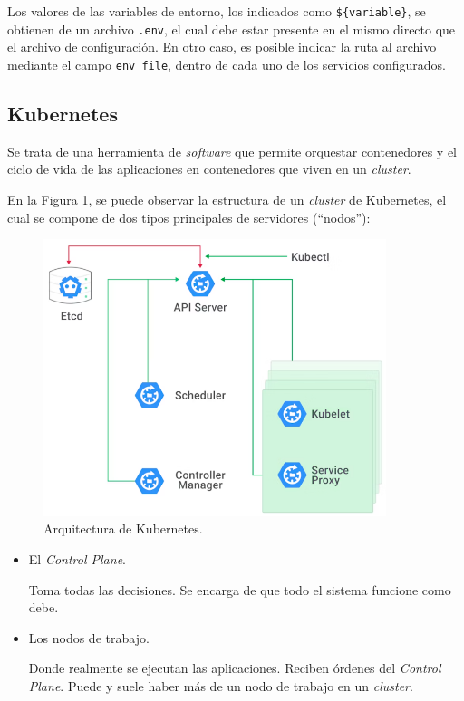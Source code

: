 Los valores de las variables de entorno, los indicados como \texttt{\$\{variable\}}, se obtienen de un archivo \texttt{.env}, el cual debe estar presente en el mismo directo que el archivo de configuración. En otro caso, es posible indicar la ruta al archivo mediante el campo \texttt{env\_file}, dentro de cada uno de los servicios configurados.

\subsection*{Kubernetes}
\label{tech:k8s}

Se trata de una herramienta de \textit{software} que permite orquestar contenedores y el ciclo de vida de las aplicaciones en contenedores que viven en un \textit{cluster}.

En la Figura \ref{fig:k8s}, se puede observar la estructura de un \textit{cluster} de Kubernetes, el cual se compone de dos tipos principales de servidores (``nodos''):

\begin{figure}
  \centerline{\includegraphics[width=10cm]{figuras/k8s}}
  \caption{Arquitectura de Kubernetes\cite{img:k8s}.}
  \label{fig:k8s}
\end{figure}

\begin{itemize}
  \item El \textit{Control Plane}.

    Toma todas las decisiones. Se encarga de que todo el sistema funcione como debe.

  \item Los nodos de trabajo.

    Donde realmente se ejecutan las aplicaciones. Reciben órdenes del \textit{Control Plane}. Puede y suele haber más de un nodo de trabajo en un \textit{cluster}.
\end{itemize}

